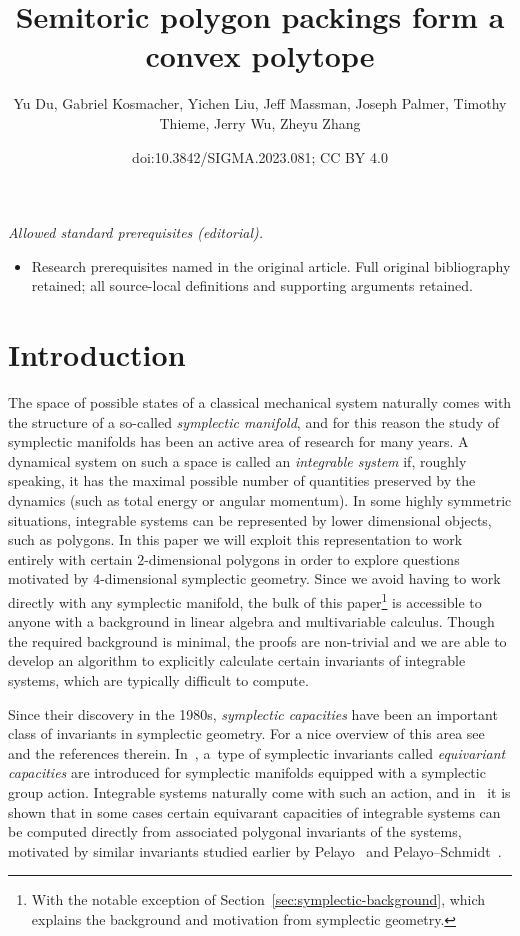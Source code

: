 \documentclass[10pt,a4paper]{amsart}
\title{Semitoric polygon packings form a convex polytope}
\author{Yu Du, Gabriel Kosmacher, Yichen Liu, Jeff Massman, Joseph Palmer, Timothy Thieme, Jerry Wu, Zheyu Zhang}
\date{doi:10.3842/SIGMA.2023.081; CC BY 4.0}
\numberwithin{equation}{section}
\theoremstyle{definition}
\theoremstyle{plain}
\theoremstyle{plain}
\begin{document}
\maketitle
\noindent\textit{Allowed standard prerequisites (editorial).}\begin{itemize}
\item Research prerequisites named in the original article. Full original bibliography retained; all source-local definitions and supporting arguments retained.
\end{itemize}\medskip
\section{Introduction}

The space of possible states of a classical mechanical
system naturally comes with the structure of a so-called
\emph{symplectic manifold},
and for this reason the study of symplectic manifolds has been an active area of research for many years.
A dynamical system on
such a space is called an \emph{integrable system} if, roughly speaking, it has the maximal
possible number of quantities preserved by the dynamics (such as total energy or angular momentum).
In some highly symmetric situations, integrable systems can be represented by lower dimensional objects, such as polygons.
In this paper we will exploit this representation to
work entirely with certain $2$-dimensional polygons in order to
explore questions motivated by $4$-dimensional symplectic geometry.
Since we avoid having to work directly with any symplectic manifold, the bulk of this paper\footnote{With the notable exception of Section~\ref{sec:symplectic-background}, which explains the background and motivation from symplectic geometry.} is accessible to anyone with a background in linear algebra and multivariable calculus.
Though the required background is minimal, the proofs are non-trivial and we are able to develop an algorithm to explicitly calculate certain invariants of integrable systems, which are typically difficult to compute.

Since their discovery in the 1980s, \emph{symplectic capacities}
have been an important class of invariants in symplectic
geometry.
For a nice overview of this area see~\cite{CiHoLaSc2007} and the references therein. In~\cite{FiPaPe2016}, a~type of symplectic
invariants called \emph{equivariant capacities} are introduced for symplectic manifolds equipped with a symplectic group action. Integrable systems naturally come with such an action, and in~\cite{FiPaPe2016} it is shown that in some cases certain equivarant capacities of integrable systems can be computed directly from associated polygonal invariants of the systems, motivated by similar invariants studied earlier by Pelayo~\cite{Pe2006,Pe2007} and Pelayo--Schmidt~\cite{PeSc2008}.
\end{document}
